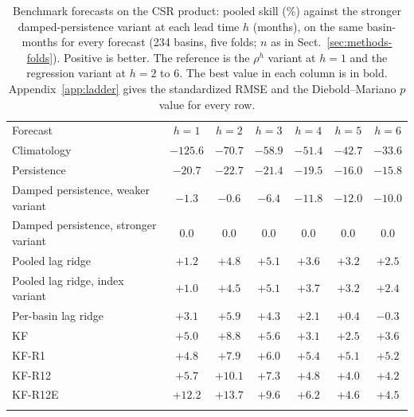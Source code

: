 \documentclass[hess, manuscript]{copernicus}
\begin{document}
\begin{table}[!htbp]
\caption{Benchmark forecasts on the CSR product: pooled skill (\%) against
the stronger damped-persistence variant at each lead time $h$ (months), on
the same basin-months for every forecast (234 basins, five folds; $n$ as in
Sect.~\ref{sec:methods-folds}). Positive is better. The reference is the
$\rho^{h}$ variant at $h = 1$ and the regression variant at $h = 2$ to 6.
The best value in each column is in bold. Appendix~\ref{app:ladder} gives
the standardized RMSE and the Diebold--Mariano $p$ value for every row.}
\label{tab:ladder}
\begin{tabular}{lcccccc}
\tophline
Forecast & $h{=}1$ & $h{=}2$ & $h{=}3$ & $h{=}4$ & $h{=}5$ & $h{=}6$ \\
\middlehline
Climatology                    & $-125.6$ & $-70.7$ & $-58.9$ & $-51.4$ & $-42.7$ & $-33.6$ \\
Persistence                    & $-20.7$  & $-22.7$ & $-21.4$ & $-19.5$ & $-16.0$ & $-15.8$ \\
Damped persistence, weaker variant & $-1.3$ & $-0.6$ & $-6.4$ & $-11.8$ & $-12.0$ & $-10.0$ \\
Damped persistence, stronger variant & $0.0$ & $0.0$ & $0.0$ & $0.0$ & $0.0$ & $0.0$ \\
Pooled lag ridge               & $+1.2$   & $+4.8$  & $+5.1$  & $+3.6$  & $+3.2$  & $+2.5$ \\
Pooled lag ridge, index variant & $+1.0$  & $+4.5$  & $+5.1$  & $+3.7$  & $+3.2$  & $+2.4$ \\
Per-basin lag ridge            & $+3.1$   & $+5.9$  & $+4.3$  & $+2.1$  & $+0.4$  & $-0.3$ \\
KF                             & $+5.0$   & $+8.8$  & $+5.6$  & $+3.1$  & $+2.5$  & $+3.6$ \\
KF-R1                          & $+4.8$   & $+7.9$  & $+6.0$  & $+5.4$  & $\mathbf{+5.1}$ & $\mathbf{+5.2}$ \\
KF-R12                         & $+5.7$   & $+10.1$ & $+7.3$  & $+4.8$  & $+4.0$  & $+4.2$ \\
KF-R12E                        & $\mathbf{+12.2}$ & $\mathbf{+13.7}$ & $\mathbf{+9.6}$ & $\mathbf{+6.2}$ & $+4.6$ & $+4.5$ \\
\bottomhline
\end{tabular}
\end{table}
\end{document}

